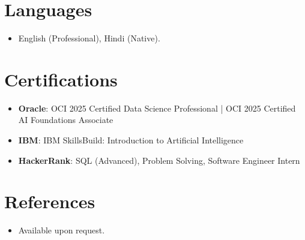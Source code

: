 \documentclass[11pt,a4paper,sans]{moderncv}
\begin{document}
\section{Languages}
\vspace{1pt}
\begin{itemize}
\item English (Professional), Hindi (Native).
\end{itemize}

\section{Certifications}
\vspace{1pt}
\begin{itemize}
\item \textbf{Oracle}: OCI 2025 Certified Data Science Professional | OCI 2025 Certified AI Foundations Associate
\item \textbf{IBM}: IBM SkillsBuild: Introduction to Artificial Intelligence
\item \textbf{HackerRank}: SQL (Advanced), Problem Solving, Software Engineer Intern
\end{itemize}

\section{References}
\vspace{1pt}
\begin{itemize}
\item Available upon request.
\end{itemize}
\end{document}

